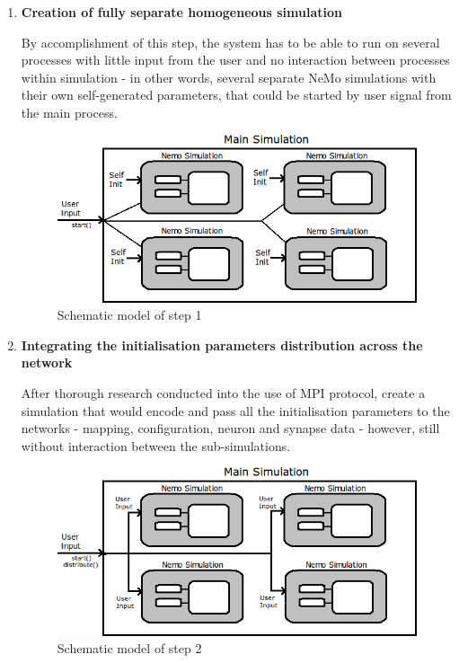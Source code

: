 \begin{enumerate}

\item{\textbf{Creation of fully separate homogeneous simulation}}

By accomplishment of this step, the system has to be able to run on several processes with little input from the user and no interaction between processes within simulation - in other words, several separate NeMo simulations with their own self-generated parameters, that could be started by user signal from the main process.

\begin{figure}[h!]
\begin{center}
\includegraphics[scale = 0.45]{images/design_stage_1.png}
\end{center}
\caption{Schematic model of step 1}
\end{figure}

\item{\textbf{Integrating the initialisation parameters distribution across the network}}

After thorough research conducted into the use of MPI protocol, create a simulation that would encode and pass all the initialisation parameters to the networks - mapping, configuration, neuron and synapse data - however, still without interaction between the sub-simulations.

\begin{figure}[h!]
\begin{center}
\includegraphics[scale = 0.45]{images/design_stage_2.png}
\end{center}
\caption{Schematic model of step 2}
\end{figure}


\end{enumerate}
